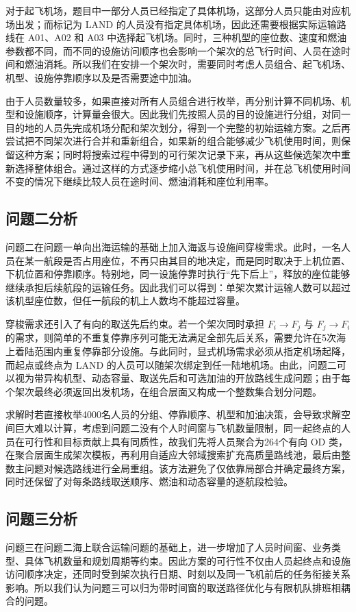 \documentclass[UTF-8,a4paper,zihao=-4]{ctexart}
\begin{document}
对于起飞机场，题目中一部分人员已经指定了具体机场，这部分人员只能由对应机场出发；而标记为 LAND 的人员没有指定具体机场，因此还需要根据实际运输路线在 A01、A02 和 A03 中选择起飞机场。同时，三种机型的座位数、速度和燃油参数都不同，而不同的设施访问顺序也会影响一个架次的总飞行时间、人员在途时间和燃油消耗。所以我们在安排一个架次时，需要同时考虑人员组合、起飞机场、机型、设施停靠顺序以及是否需要途中加油。

由于人员数量较多，如果直接对所有人员组合进行枚举，再分别计算不同机场、机型和设施顺序，计算量会很大。因此我们先按照人员的目的设施进行分组，对同一目的地的人员先完成机场分配和架次划分，得到一个完整的初始运输方案。之后再尝试把不同架次进行合并和重新组合，如果新的组合能够减少飞机使用时间，则保留这种方案；同时将搜索过程中得到的可行架次记录下来，再从这些候选架次中重新选择整体组合。通过这样的方式逐步缩小总飞机使用时间，并在总飞机使用时间不变的情况下继续比较人员在途时间、燃油消耗和座位利用率。

\subsection{问题二分析}
问题二在问题一单向出海运输的基础上加入海返与设施间穿梭需求。此时，一名人员在某一航段是否占用座位，不再只由其目的地决定，而是同时取决于上机位置、下机位置和停靠顺序。特别地，同一设施停靠时执行“先下后上”，释放的座位能够继续承担后续航段的运输任务。因此我们可以得到：单架次累计运输人数可以超过该机型座位数，但任一航段的机上人数均不能超过容量。

穿梭需求还引入了有向的取送先后约束。若一个架次同时承担 $F_i\to F_j$ 与 $F_j\to F_i$ 的需求，则简单的不重复停靠序列可能无法满足全部先后关系，需要允许在5次海上着陆范围内重复停靠部分设施。与此同时，显式机场需求必须从指定机场起降，而起点或终点为 LAND 的人员可以随架次绑定到任一陆地机场。由此，问题二可以视为带异构机型、动态容量、取送先后和可选加油的开放路线生成问题；由于每个架次最终必须返回出发机场，在组合层面又构成一个整数集合划分问题。

求解时若直接枚举4000名人员的分组、停靠顺序、机型和加油决策，会导致求解空间巨大难以计算，考虑到问题二没有个人时间窗与飞机数量限制，同一起终点的人员在可行性和目标贡献上具有同质性，故我们先将人员聚合为264个有向 OD 类，在聚合层面生成架次模板，再利用自适应大邻域搜索扩充高质量路线池，最后由整数主问题对候选路线进行全局重组。该方法避免了仅依靠局部合并确定最终方案，同时还保留了对每条路线取送顺序、燃油和动态容量的逐航段检验。


\subsection{问题三分析}
问题三在问题二海上联合运输问题的基础上，进一步增加了人员时间窗、业务类型、具体飞机数量和规划周期等约束。因此方案的可行性不仅由人员起终点和设施访问顺序决定，还同时受到架次执行日期、时刻以及同一飞机前后的任务衔接关系影响。所以我们认为问题三可以归为带时间窗的取送路径优化与有限机队排班相耦合的问题。
\end{document}
